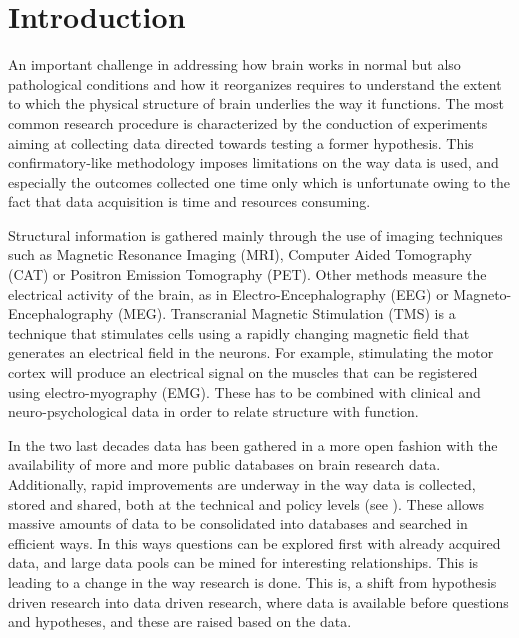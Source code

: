 \documentclass[utf8,paper]{frontiersSCNS} %
\begin{document}




\section{Introduction}


An important challenge in addressing how brain works in normal but also pathological conditions and how it reorganizes  requires to understand the extent to which the physical structure of brain underlies the way it functions. The most common research procedure is characterized by the conduction of experiments aiming at collecting data directed towards testing a former hypothesis. This  confirmatory-like methodology imposes limitations on the way data is used, and especially the outcomes collected one time only which is unfortunate owing to the fact that data acquisition is time and resources consuming.

Structural information is gathered mainly through the use of imaging techniques such as Magnetic Resonance Imaging (MRI), Computer Aided Tomography (CAT) or Positron Emission Tomography (PET). Other methods measure the electrical activity of the brain, as in Electro-Encephalography (EEG) or Magneto-Encephalography (MEG). Transcranial Magnetic Stimulation (TMS) is a technique that stimulates cells using a rapidly changing magnetic field that generates an electrical field in the neurons. For example, stimulating the motor cortex will produce an electrical signal on the muscles that can be registered using electro-myography (EMG). These has to be combined with clinical and neuro-psychological data in order to relate structure with function.
										
In the two last decades data has been gathered in a more open fashion with the availability of more and more public databases on brain research data. Additionally, rapid improvements are underway in the way data is collected, stored and shared, both at the technical and policy levels (see \cite{eckersley_neuroscience_2003}). These allows massive amounts of data to be consolidated into databases and searched in efficient ways. In this ways questions can be explored first with already acquired data, and large data pools can be mined for interesting relationships. This is leading to a change in the way research is done. This is, a shift from hypothesis driven research into data driven research, where data is available before questions and hypotheses, and these are raised based on the data.
				
\end{document}
